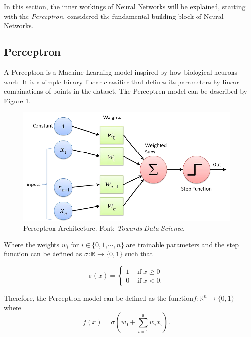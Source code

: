 In this section, the inner workings of Neural Networks will be explained, starting with the \emph{Perceptron}, considered the fundamental building block of Neural Networks.

\subsection{Perceptron}

A Perceptron is a Machine Learning model inspired by how biological neurons work. 
It is a simple binary linear classifier that defines its parameters by linear combinations of points in the dataset.
The Perceptron model can be described by Figure \ref{fig:perceptron}. 

\begin{figure}
    \centering
    \includegraphics[scale=0.4]{figuras/perceptron.png}
    \caption{Perceptron Architecture. Font: \emph{Towards Data Science\footnotemark}. \label{fig:perceptron}}
\end{figure}

Where the weights \(w_i\) for \(i \in \{0, 1, \cdots, n\}\) are trainable parameters and the step function can be defined as \(\sigma \colon \mathbb{R} \to \{0, 1\}\) such that

\begin{equation}
    \sigma(x) = 
    \begin{cases}
        1 & \text{ if } x \geq 0 \\
        0 & \text{ if } x < 0.
    \end{cases}
    \label{eq:step_function_perceptron}    
\end{equation}

Therefore, the Perceptron model can be defined as the function\footnotemark \(f \colon \mathbb{R}^n \to \{0, 1\}\) where
\begin{equation}
    f(x) = \sigma(w_0 + \sum_{i = 1}^{n} w_i x_i).
    \label{eq:perceptron}
\end{equation}

